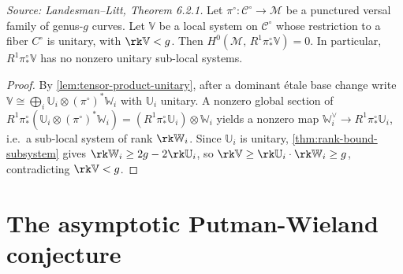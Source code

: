 \begin{theorem}
  \label{thm:cohomological-vanishing}
  \textit{Source: Landesman--Litt, Theorem 6.2.1.}
  Let $\pi^\circ\colon \mathcal{C}^\circ \to \mathcal{M}$ be a punctured versal
  family of genus-$g$ curves.
  Let $\mathbb{V}$ be a local system on $\mathcal{C}^\circ$ whose restriction
  to a fiber $C^\circ$ is unitary, with $\rk \mathbb{V} < g$.
  Then $H^0(\mathcal{M},\, R^1\pi^\circ_* \mathbb{V}) = 0$.
  In particular, $R^1\pi^\circ_* \mathbb{V}$ has no nonzero unitary
  sub-local systems.
\end{theorem}

\begin{proof}
  By \cref{lem:tensor-product-unitary}, after a dominant \'{e}tale base change
  write $\mathbb{V} \cong \bigoplus_i \mathbb{U}_i \otimes (\pi^\circ)^* \mathbb{W}_i$
  with $\mathbb{U}_i$ unitary.
  A nonzero global section of $R^1\pi^\circ_*(\mathbb{U}_i \otimes (\pi^\circ)^* \mathbb{W}_i)
  = (R^1\pi^\circ_* \mathbb{U}_i) \otimes \mathbb{W}_i$ yields a nonzero map
  $\mathbb{W}_i^\vee \to R^1\pi^\circ_* \mathbb{U}_i$, i.e.\ a sub-local system
  of rank $\rk\mathbb{W}_i$.
  Since $\mathbb{U}_i$ is unitary, \cref{thm:rank-bound-subsystem} gives
  $\rk\mathbb{W}_i \geq 2g - 2\rk\mathbb{U}_i$, so
  $\rk\mathbb{V} \geq \rk\mathbb{U}_i \cdot \rk\mathbb{W}_i \geq g$,
  contradicting $\rk\mathbb{V} < g$.
\end{proof}

\section{The asymptotic Putman-Wieland conjecture}


